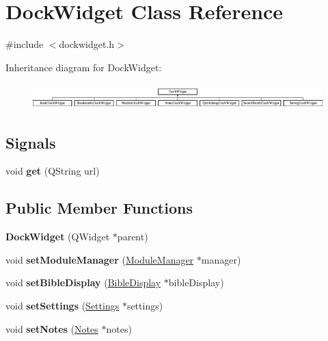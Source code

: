 \hypertarget{classDockWidget}{
\section{DockWidget Class Reference}
\label{classDockWidget}
}


{\ttfamily \#include $<$dockwidget.h$>$}

Inheritance diagram for DockWidget:\begin{figure}[H]
\begin{center}
\leavevmode
\includegraphics[height=0.987654cm]{classDockWidget}
\end{center}
\end{figure}
\subsection*{Signals}
\begin{DoxyCompactItemize}
\item 
\hypertarget{classDockWidget_a9fd17bf8594158048b595c12261a9f0c}{
void {\bfseries get} (QString url)}
\label{classDockWidget_a9fd17bf8594158048b595c12261a9f0c}

\end{DoxyCompactItemize}
\subsection*{Public Member Functions}
\begin{DoxyCompactItemize}
\item 
\hypertarget{classDockWidget_a85036ae61d7594bbf319bef16cd80d35}{
{\bfseries DockWidget} (QWidget $\ast$parent)}
\label{classDockWidget_a85036ae61d7594bbf319bef16cd80d35}

\item 
\hypertarget{classDockWidget_a9d86e039e3ddfd2629e31edfbed75e79}{
void {\bfseries setModuleManager} (\hyperlink{classModuleManager}{ModuleManager} $\ast$manager)}
\label{classDockWidget_a9d86e039e3ddfd2629e31edfbed75e79}

\item 
\hypertarget{classDockWidget_ae7e6cce8f18a0b1304a6effd193fc784}{
void {\bfseries setBibleDisplay} (\hyperlink{classBibleDisplay}{BibleDisplay} $\ast$bibleDisplay)}
\label{classDockWidget_ae7e6cce8f18a0b1304a6effd193fc784}

\item 
\hypertarget{classDockWidget_ad7790095b6ea0e097870c3cc51729b14}{
void {\bfseries setSettings} (\hyperlink{classSettings}{Settings} $\ast$settings)}
\label{classDockWidget_ad7790095b6ea0e097870c3cc51729b14}

\item 
\hypertarget{classDockWidget_a5e309057de91086fc4af4c3f3f9c138f}{
void {\bfseries setNotes} (\hyperlink{classNotes}{Notes} $\ast$notes)}
\label{classDockWidget_a5e309057de91086fc4af4c3f3f9c138f}

\end{DoxyCompactItemize}
